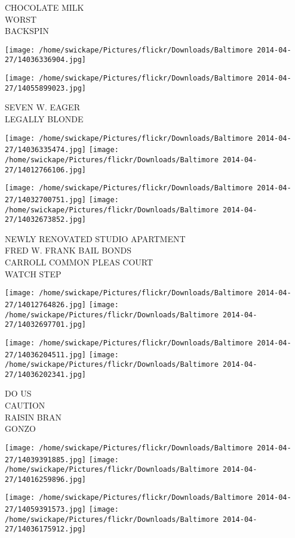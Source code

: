 \documentclass[10pt,letterpaper]{article}
\begin{document}
CHOCOLATE MILK\\
WORST\\
BACKSPIN
\pagebreak

\texttt{[image: /home/swickape/Pictures/flickr/Downloads/Baltimore 2014-04-27/14036336904.jpg]}

\vspace{0.25in}
\texttt{[image: /home/swickape/Pictures/flickr/Downloads/Baltimore 2014-04-27/14055899023.jpg]}

SEVEN W. EAGER\\
LEGALLY BLONDE
\pagebreak

\texttt{[image: /home/swickape/Pictures/flickr/Downloads/Baltimore 2014-04-27/14036335474.jpg]}
\texttt{[image: /home/swickape/Pictures/flickr/Downloads/Baltimore 2014-04-27/14012766106.jpg]}

\texttt{[image: /home/swickape/Pictures/flickr/Downloads/Baltimore 2014-04-27/14032700751.jpg]}
\texttt{[image: /home/swickape/Pictures/flickr/Downloads/Baltimore 2014-04-27/14032673852.jpg]}

NEWLY RENOVATED STUDIO APARTMENT\\
FRED W. FRANK BAIL BONDS\\
CARROLL COMMON PLEAS COURT\\
WATCH STEP
\pagebreak

\texttt{[image: /home/swickape/Pictures/flickr/Downloads/Baltimore 2014-04-27/14012764826.jpg]}
\texttt{[image: /home/swickape/Pictures/flickr/Downloads/Baltimore 2014-04-27/14032697701.jpg]}

\texttt{[image: /home/swickape/Pictures/flickr/Downloads/Baltimore 2014-04-27/14036204511.jpg]}
\texttt{[image: /home/swickape/Pictures/flickr/Downloads/Baltimore 2014-04-27/14036202341.jpg]}

DO US\\
CAUTION\\
RAISIN BRAN\\
GONZO
\pagebreak

\texttt{[image: /home/swickape/Pictures/flickr/Downloads/Baltimore 2014-04-27/14039391885.jpg]}
\texttt{[image: /home/swickape/Pictures/flickr/Downloads/Baltimore 2014-04-27/14016259896.jpg]}

\texttt{[image: /home/swickape/Pictures/flickr/Downloads/Baltimore 2014-04-27/14059391573.jpg]}
\texttt{[image: /home/swickape/Pictures/flickr/Downloads/Baltimore 2014-04-27/14036175912.jpg]}
\end{document}
